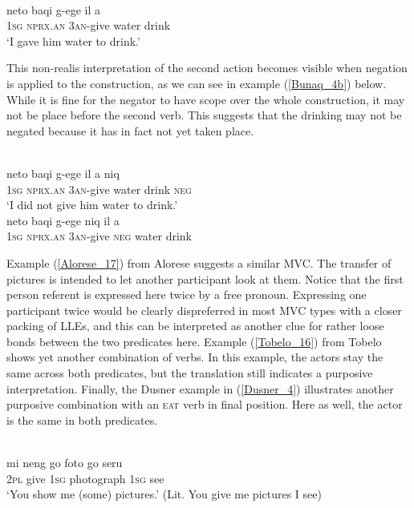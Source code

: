 \ea \label{Bunaq_4}
\\
\gll neto baqi g-ege il a \\
1\textsc{sg} \textsc{nprx}.\textsc{an} 3\textsc{an}-give water drink \\
\glft ‘I gave him water to drink.’\\ 
\z

This non-realis interpretation of the second action becomes visible when negation is applied to the construction, as we can see in example (\ref{Bunaq_4b}) below. While it is fine for the negator to have scope over the whole construction, it may not be place before the second verb. This suggests that the drinking may not be negated because it has in fact not yet taken place. 

\ea \label{Bunaq_4b}
\\
\ea
\gll neto baqi g-ege il a niq \\
1\textsc{sg} \textsc{nprx}.\textsc{an} 3\textsc{an}-give water drink \textsc{neg} \\
\glft ‘I did not give him water to drink.’ \\ 
\ex
\gll *neto baqi g-ege niq il a \\ 
1\textsc{sg} \textsc{nprx}.\textsc{an} 3\textsc{an}-give \textsc{neg} water drink \\
\z
\z

Example (\ref{Alorese_17}) from Alorese suggests a similar MVC. The transfer of pictures is intended to let another participant look at them. Notice that the first person referent is expressed here twice by a free pronoun. Expressing one participant twice would be clearly dispreferred in most MVC types with a closer packing of LLEs, and this can be interpreted as another clue for rather loose bonds between the two predicates here. Example (\ref{Tobelo_16}) from Tobelo shows yet another combination of verbs. In this example, the actors stay the same across both predicates, but the translation still indicates a purposive interpretation. Finally, the Dusner example in (\ref{Dusner_4}) illustrates another purposive combination with an \textsc{eat} verb in final position. Here as well, the actor is the same in both predicates.

\ea \label{Alorese_17}
\\
\gll mi neng go foto go seru \\
2\textsc{pl} give 1\textsc{sg} photograph 1\textsc{sg} see \\
\glft `You show me (some) pictures.' (Lit. You give me pictures I see) \\ 
\z

